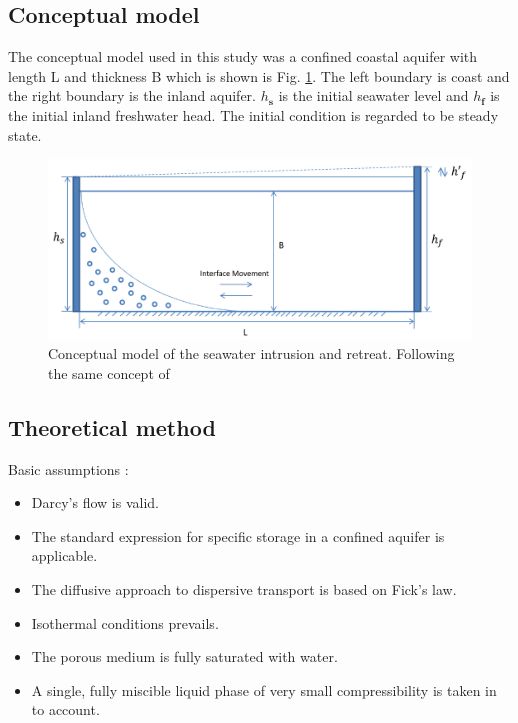 \documentclass[review]{elsarticle}
\newcommand{\mbf}[1]{{\mathbf{#1}}}%
\begin{document}
\subsection{Conceptual model}

The conceptual model used in this study was a confined coastal aquifer with length L and thickness B which is shown is Fig. \ref{fig:seawater_intrusion}. The left boundary is coast and the right boundary is the inland aquifer. $h_\mbf{s}$ is the initial seawater level and $h_\mbf{f}$ is the initial inland freshwater head. The initial condition is regarded to be steady state. 
\begin{figure}
\centering
\includegraphics[width=1.0\textwidth]{figures/seawater_intrusion}
\caption{Conceptual model of the seawater intrusion and retreat. Following the same concept of \cite{lu2013timescales}}
\label{fig:seawater_intrusion}
\end{figure}

\subsection{Theoretical method}
Basic assumptions \cite{guo2002user}: 
\begin{itemize}
\item Darcy's flow is valid.  
\item The standard expression for specific storage in a confined aquifer is applicable.
\item The diffusive approach to dispersive transport is based on Fick's law.
\item Isothermal conditions prevails. 
\item The porous medium is fully saturated with water.
\item A single, fully miscible liquid phase of very small compressibility is taken in to account. 
\end{itemize}
\end{document}
